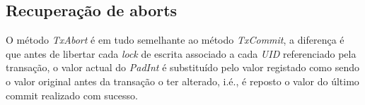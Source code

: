 \subsection{Recuperação de aborts}

O método \textit{TxAbort} é em tudo semelhante ao método \textit{TxCommit}, a diferença é que antes de libertar cada \textit{lock} de escrita associado a cada \textit{UID} referenciado pela transação, o valor actual do \textit{PadInt} é substituído pelo valor registado como sendo o valor original antes da transação o ter alterado, i.é., é reposto o valor do último commit realizado com sucesso. 
